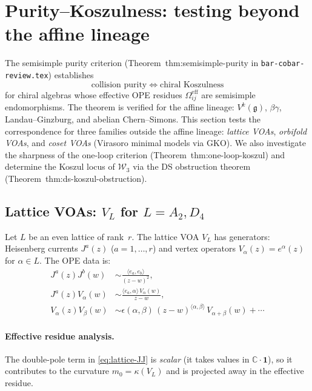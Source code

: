 \documentclass[11pt]{article}
\newcommand{\cW}{\mathcal{W}}
\newcommand{\C}{\mathbb{C}}
\begin{document}
\section{Purity--Koszulness: testing beyond the affine lineage}
\label{sec:purity-koszul-beyond-affine}

The semisimple purity criterion (Theorem~thm:semisimple-purity
in \texttt{bar-cobar-review.tex}) establishes
\[
\text{collision purity}
\;\Longleftrightarrow\;
\text{chiral Koszulness}
\]
for chiral algebras whose effective OPE residues
$\Omega_{ij}^{\mathrm{eff}}$ are semisimple endomorphisms.
The theorem is verified for the affine lineage:
$V^k(\mathfrak{g})$, $\beta\gamma$, Landau--Ginzburg, and
abelian Chern--Simons.  This section tests the correspondence
for three families outside the affine lineage:
\emph{lattice VOAs}, \emph{orbifold VOAs}, and
\emph{coset VOAs} (Virasoro minimal models via GKO).
We also investigate the sharpness of the one-loop criterion
(Theorem~thm:one-loop-koszul) and determine the Koszul
locus of $\cW_3$ via the DS obstruction theorem
(Theorem~thm:ds-koszul-obstruction).

\subsection{Lattice VOAs: $V_L$ for $L = A_2, D_4$}
\label{subsec:lattice-purity}

Let $L$ be an even lattice of rank~$r$.  The lattice VOA
$V_L$ has generators: Heisenberg currents $J^a(z)$
($a = 1,\ldots,r$) and vertex operators $V_\alpha(z) = e^\alpha(z)$
for $\alpha \in L$.  The OPE data is:
\begin{align}
J^a(z) J^b(w) &\sim \frac{\langle e_a, e_b \rangle}{(z-w)^2},
  \label{eq:lattice-JJ}\\
J^a(z) V_\alpha(w) &\sim
  \frac{\langle e_a, \alpha\rangle\, V_\alpha(w)}{z-w},
  \label{eq:lattice-JV}\\
V_\alpha(z) V_\beta(w) &\sim
  \epsilon(\alpha,\beta)\,
  (z-w)^{\langle\alpha,\beta\rangle}\,
  V_{\alpha+\beta}(w) + \cdots
  \label{eq:lattice-VV}
\end{align}

\paragraph{Effective residue analysis.}
The double-pole term in \eqref{eq:lattice-JJ} is
\emph{scalar} (it takes values in $\C\cdot\mathbf{1}$),
so it contributes to the curvature $m_0 = \kappa(V_L)$
and is projected away in the effective residue.
\end{document}

